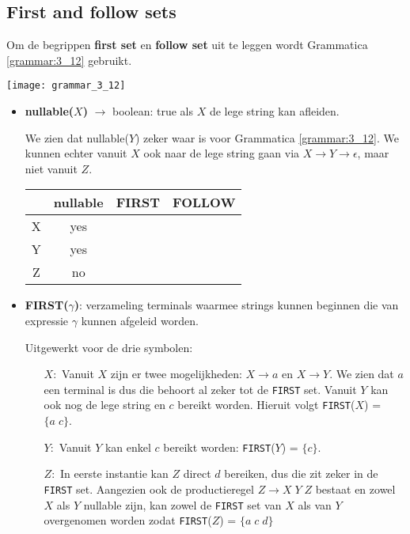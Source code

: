 \subsection{First and follow sets}
Om de begrippen \textbf{first set} en \textbf{follow set} uit te leggen wordt Grammatica \ref{grammar:3_12} gebruikt.
\begin{grammarfigure}
	\texttt{[image: grammar\_3\_12]}
	\caption{}
	\label{grammar:3_12}
\end{grammarfigure}
\begin{itemize}
	\item \textbf{nullable($X$)} $\rightarrow$ boolean: true als $X$ de lege string kan afleiden.
	
	We zien dat nullable($Y$) zeker waar is voor Grammatica \ref{grammar:3_12}. We kunnen echter vanuit $X$ ook naar de lege string gaan via $X \rightarrow Y \rightarrow \epsilon$, maar niet vanuit $Z$.
	
	\begin{table}[h]
		\centering
		\begin{tabular}{c | c c c}
	      & nullable & FIRST & FOLLOW \\
	      \hline
		X & yes & & \\
		Y & yes & & \\
		Z & no & & 
		\end{tabular}
	\end{table}
	
	\item \textbf{FIRST($\gamma$)}: verzameling terminals waarmee strings kunnen beginnen die van expressie $\gamma$ kunnen afgeleid worden.
	
	Uitgewerkt voor de drie symbolen:
	\begin{itemize}
		\item[$X:$] Vanuit $X$ zijn er twee mogelijkheden: $X \rightarrow a$ en $X \rightarrow Y$. We zien dat $a$ een terminal is dus die behoort al zeker tot de \texttt{FIRST} set. Vanuit $Y$ kan ook nog de lege string en $c$ bereikt worden. Hieruit volgt \texttt{FIRST}($X$) = $\{a\;c\}$.
		\item[$Y:$] Vanuit $Y$ kan enkel $c$ bereikt worden: \texttt{FIRST}($Y$) = $\{c\}$.
		\item[$Z:$] In eerste instantie kan $Z$ direct $d$ bereiken, dus die zit zeker in de \texttt{FIRST} set. Aangezien ook de productieregel $Z \rightarrow X\;Y\;Z$ bestaat en zowel $X$ als $Y$ nullable zijn, kan zowel de \texttt{FIRST} set van $X$ als van $Y$ overgenomen worden zodat \texttt{FIRST}($Z$) = $\{a\;c\;d\}$
	\end{itemize}


\end{itemize}
